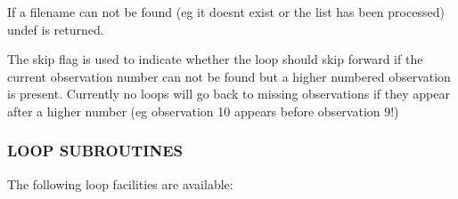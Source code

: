 If a filename can not be found (eg it doesnt exist or the list has
been processed) undef is returned.



The skip flag is used to indicate whether the loop should skip
forward if the current observation number can not be found
but a higher numbered observation is present. Currently no loops
will go back to missing observations if they appear after a higher
number (eg observation 10 appears before observation 9!)

\subsubsection*{LOOP SUBROUTINES\label{ORAC::Loop_LOOP_SUBROUTINES}}

The following loop facilities are available:

